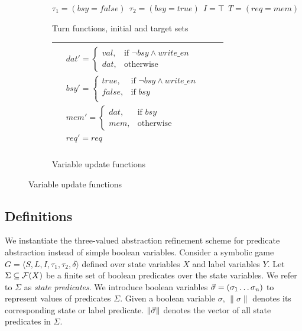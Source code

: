\begin{figure}
    \centering
    \label{fig:ex_game_specification}
    \caption{Game specification}
    \begin{subfigure}{\linewidth}
    \caption{Turn functions, initial and target sets}
    $\tau_1=(bsy=false)~~\tau_2=(bsy=true)~~I=\top~~T=(req=mem)$
    \end{subfigure}

    \begin{subfigure}{\linewidth}
    \caption{Variable update functions}
    \begin{tabular}{|p{0.9\linewidth}|}
        \hline
        $
        \begin{aligned}
            &dat' = \begin{cases}
                        val, & \text{if } \neg bsy \wedge write\_en \\
                        dat, & \text{otherwise}
                    \end{cases}\\
            &bsy' = \begin{cases} 
                        true,   & \text{if } \neg bsy \wedge write\_en \\
                        false,  & \text{if } bsy \\
                    \end{cases}\\
            &mem' = \begin{cases}
                        dat, & \text{if } bsy \\
                        mem, & \text{otherwise}
                    \end{cases}\\
            &req' = req\\
        \end{aligned}
        $ \\
        \hline
    \end{tabular}
    \end{subfigure}

\end{figure}

\subsection{Definitions}

We instantiate the three-valued abstraction refinement scheme for predicate abstraction instead of simple boolean variables. Consider a symbolic game $G = \langle S, L, I, \tau_1, \tau_2, \delta \rangle$ defined over state variables $X$ and label variables $Y$. Let $\Sigma\subseteq\mathcal{F}(X)$ be a finite set of boolean predicates over the state variables. We refer to $\Sigma$ as \emph{state predicates}. We introduce boolean variables $\vec{\sigma}=(\sigma_1\ldots\sigma_n)$ to represent values of predicates $\Sigma$. Given a boolean variable $\sigma$, $\|\sigma\|$ denotes its corresponding state or label predicate. $\|\vec{\sigma}\|$ denotes the vector of all state predicates in $\Sigma$.

